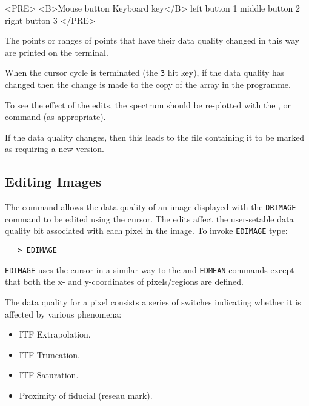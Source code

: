 \begin{htmlonly}
\begin{rawhtml}
<PRE>
<B>Mouse button      Keyboard key</B>
left button            1
middle button          2
right button           3
</PRE>
\end{rawhtml}
\end{htmlonly}

The points or ranges of points that have their data quality changed in this way
are printed on the terminal.

When the cursor cycle is terminated (the \verb+3+ hit key), if the data quality
has changed then the change is made to the copy of the array in the programme.

To see the effect of the edits, the spectrum should be re-plotted with the
, 
or  command (as appropriate)\@.

If the data quality changes, then this leads to the file containing it
to be marked as requiring a new version.


\subsection{Editing Images}

The  command allows the data quality of
an image displayed with the \verb+DRIMAGE+ command to be edited using
the cursor.  The edits affect the user-setable data quality bit
associated with each pixel in the image.  To invoke \verb+EDIMAGE+ type:

\begin{verbatim}
   > EDIMAGE
\end{verbatim}

\verb+EDIMAGE+ uses the cursor in a similar way to the
 and
\verb+EDMEAN+ commands except that both the x- and y-coordinates of
pixels/regions are defined.

The data quality for a pixel consists a series of switches indicating
whether it is affected by various phenomena:

\begin{itemize}

\item ITF Extrapolation.

\item ITF Truncation.

\item ITF Saturation.

\item Proximity of fiducial (reseau mark)\@.

\end{itemize}

